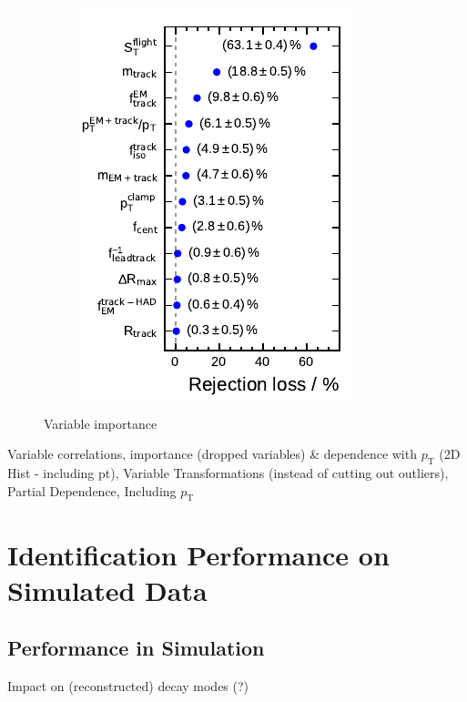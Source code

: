 \begin{figure}[ht]
  \begin{subfigure}[t]{0.33\textwidth}
    \centering
    \includegraphics{./figures/bdt_perf/var_importance/3p_iter1.pdf}
  \end{subfigure}
  \caption{Variable importance}
  \label{fig:variable_importance}
\end{figure}




Variable correlations, importance (dropped variables) \& dependence with
$p_\mathrm{T}$ (2D Hist - including pt), Variable Transformations (instead
of cutting out outliers), Partial Dependence, Including $p_\mathrm{T}$

\section{Identification Performance on Simulated Data}
\label{sec:bdt_perf}

\subsection{Performance in Simulation}
\label{sec:bdt_perf_sim}

Impact on (reconstructed) decay modes (?)

